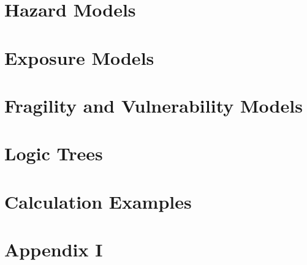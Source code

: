 \documentclass[11pt,fleqn]{book} %
\begin{document}
\chapter{Hazard Models}
	\label{chap:hazard}
	
   \cleardoublepage

\chapter{Exposure Models}
   \label{chap:exposure}
   
   \cleardoublepage

\chapter{Fragility and Vulnerability Models}
	\label{chap:vulnerability}
	
   \cleardoublepage

\chapter{Logic Trees}
	\label{chap:logic-trees}
	
   \cleardoublepage

\chapter{Calculation Examples}
   \label{chap:examples}
   
   \cleardoublepage

\appendix

\chapter{Appendix I}
   
   \cleardoublepage

\end{document}
